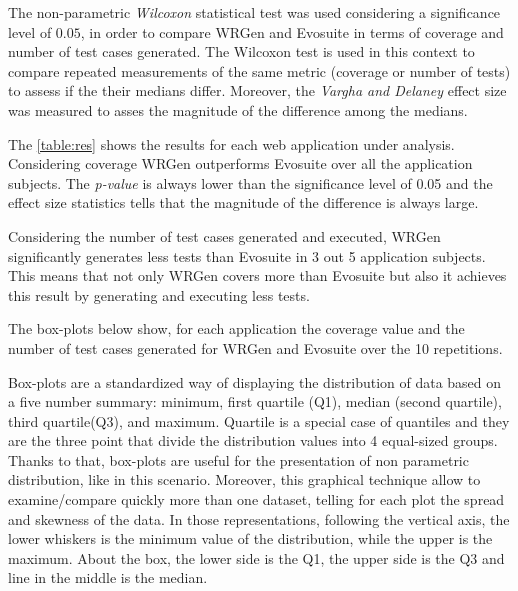 The non-parametric \textit{Wilcoxon} statistical test was used considering a significance level of $0.05$, in order to compare WRGen and Evosuite in terms of coverage and number of test cases generated. The Wilcoxon test is used in this context to compare repeated measurements of the same metric (coverage or number of tests) to assess if the their medians differ. Moreover, the \emph{Vargha and Delaney} effect size was measured to asses the magnitude of the difference among the medians.

The \autoref{table:res} shows the results for each web application under analysis. Considering coverage WRGen outperforms Evosuite over all the application subjects. The \textit{p-value} is always lower than the significance level of 0.05 and the effect size statistics tells that the magnitude of the difference is always large.

Considering the number of test cases generated and executed, WRGen significantly generates less tests than Evosuite in 3 out 5 application subjects. This means that not only WRGen covers more than Evosuite but also it achieves this result by generating and executing less tests.


\begin{figure}[H]
	\centering
	
	
\end{figure}

The box-plots below show, for each application the coverage value and the number of test cases generated for WRGen and Evosuite over the 10 repetitions. 

Box-plots are a standardized way of displaying the distribution of data based on a five number summary: minimum, first quartile (Q1), median (second quartile), third quartile(Q3), and maximum.
Quartile is a special case of quantiles and they are the three point that divide the distribution values into 4 equal-sized groups.
Thanks to that, box-plots are useful for the presentation of non parametric distribution, like in this scenario.
Moreover, this graphical technique allow to examine/compare quickly more than one dataset, telling for each plot the spread and skewness of the data.
In those representations, following the vertical axis, the lower whiskers is the minimum value of the distribution, while the upper is the maximum.
About the box, the lower side is the Q1, the upper side is the Q3 and line in the middle is the median.


